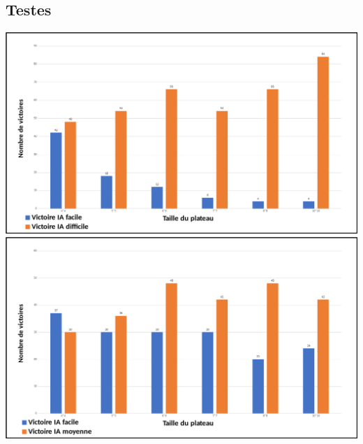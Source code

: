 \documentclass{beamer}
\begin{document}
\subsection{Testes}
\begin{frame}{}
\begin{block}{}
\begin{center}
 \includegraphics[scale=0.2]{IA10}
 \includegraphics[scale=0.2]{IA11}
\end{center}
\end{block}
\end{frame}
\end{document}
